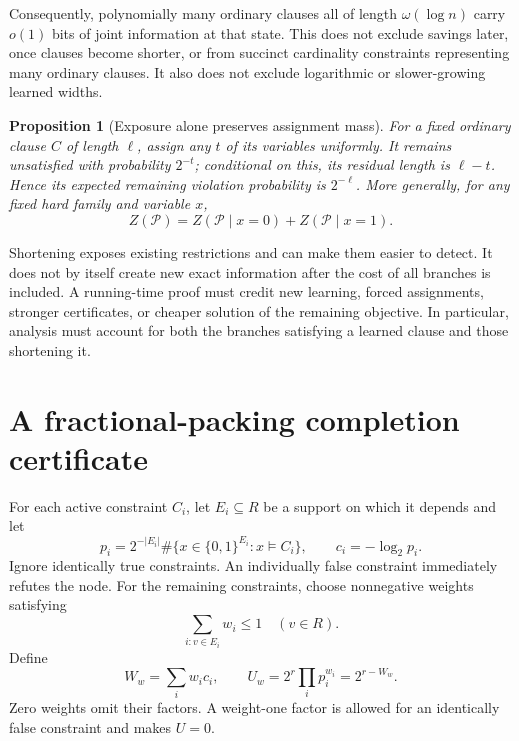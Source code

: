 \documentclass[11pt,a4paper]{article}
\newtheorem{proposition}[theorem]{Proposition}
\theoremstyle{definition}
\theoremstyle{remark}
\newcommand{\Pcal}{\mathcal P}
\begin{document}
Consequently, polynomially many ordinary clauses all of length
$\omega(\log n)$ carry $o(1)$ bits of joint information at that state.
This does not exclude savings later, once clauses become shorter, or from
succinct cardinality constraints representing many ordinary clauses.
It also does not exclude logarithmic or slower-growing learned widths.

\begin{proposition}[Exposure alone preserves assignment mass]
For a fixed ordinary clause $C$ of length $\ell$, assign any $t$ of its
variables uniformly. It remains unsatisfied with probability $2^{-t}$;
conditional on this, its residual length is $\ell-t$. Hence its expected
remaining violation probability is $2^{-\ell}$. More generally, for any
fixed hard family and variable $x$,
\[
 Z(\Pcal)=Z(\Pcal\mid x=0)+Z(\Pcal\mid x=1).
\]
\end{proposition}

Shortening exposes existing restrictions and can make them easier to
detect. It does not by itself create new exact information after the cost
of all branches is included. A running-time proof must credit new learning,
forced assignments, stronger certificates, or cheaper solution of the
remaining objective. In particular, analysis must account for both the
branches satisfying a learned clause and those shortening it.

\section{A fractional-packing completion certificate}

For each active constraint $C_i$, let $E_i\subseteq R$ be a support on
which it depends and let
\[
 p_i=2^{-|E_i|}\#\{x\in\{0,1\}^{E_i}:x\models C_i\},\qquad
 c_i=-\log_2p_i.
\]
Ignore identically true constraints. An individually false constraint
immediately refutes the node. For the remaining constraints, choose
nonnegative weights satisfying
\begin{equation}
 \sum_{i:v\in E_i}w_i\le1\quad(v\in R).             \label{eq:packing}
\end{equation}
Define
\begin{equation}
 W_w=\sum_iw_ic_i,\qquad
 U_w=2^r\prod_i p_i^{w_i}=2^{r-W_w}.                  \label{eq:bound}
\end{equation}
Zero weights omit their factors. A weight-one factor is allowed for an
identically false constraint and makes $U=0$.
\end{document}
